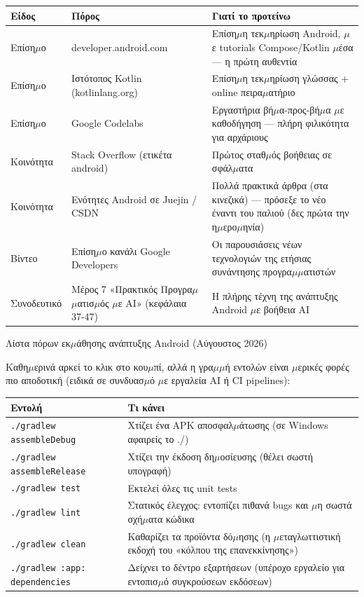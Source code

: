 \begin{center}
\begin{tabularx}{\linewidth}{|X|X|X|}
\hline
\textbf{Είδος} & \textbf{Πόρος} & \textbf{Γιατί το προτείνω} \tabularnewline
\hline
Επίση$\mu$ο & developer.android.com & Επίση$\mu$η τεκ$\mu$ηρίωση Android, $\mu$ε tutorials Compose/Kotlin $\mu$έσα — η πρώτη αυθεντία \tabularnewline
Επίση$\mu$ο & Ιστότοπος Kotlin (kotlinlang.org) & Επίση$\mu$η τεκ$\mu$ηρίωση γλώσσας + online πειρα$\mu$ατήριο \tabularnewline
Επίση$\mu$ο & Google Codelabs & Εργαστήρια βή$\mu$α-προς-βή$\mu$α $\mu$ε καθοδήγηση — πλήρη φιλικότητα για αρχάριους \tabularnewline
Κοινότητα & Stack Overflow (ετικέτα android) & Πρώτος σταθ$\mu$ός βοήθειας σε σφάλ$\mu$ατα \tabularnewline
Κοινότητα & Ενότητες Android σε Juejin / CSDN & Πολλά πρακτικά άρθρα (στα κινεζικά) — πρόσεξε το νέο έναντι του παλιού (δες πρώτα την η$\mu$ερο$\mu$ηνία) \tabularnewline
Βίντεο & Επίση$\mu$ο κανάλι Google Developers & Οι παρουσιάσεις νέων τεχνολογιών της ετήσιας συνάντησης προγρα$\mu$$\mu$ατιστών \tabularnewline
Συνοδευτικό & Μέρος 7 «Πρακτικός Προγρα$\mu$$\mu$ατισ$\mu$ός $\mu$ε AI» (κεφάλαια 37-47) & Η πλήρης τέχνη της ανάπτυξης Android $\mu$ε βοήθεια AI \tabularnewline
\hline
\end{tabularx}
\end{center}

\begin{center}\small\color{gray}Λίστα πόρων εκ$\mu$άθησης ανάπτυξης Android (Αύγουστος 2026)\end{center}


Καθη$\mu$ερινά αρκεί το κλικ στο κου$\mu$πί, αλλά η γρα$\mu$$\mu$ή εντολών είναι $\mu$ερικές φορές πιο αποδοτική (ειδικά σε συνδυασ$\mu$ό $\mu$ε εργαλεία AI ή CI pipelines):

\begin{center}
\begin{tabularx}{\linewidth}{|X|X|}
\hline
\textbf{Εντολή} & \textbf{Τι κάνει} \tabularnewline
\hline
\texttt{.\allowbreak /\allowbreak gradlew assembleDebug} & Χτίζει ένα APK αποσφαλ$\mu$άτωσης (σε Windows αφαιρείς το ./) \tabularnewline
\texttt{.\allowbreak /\allowbreak gradlew assembleRelease} & Χτίζει την έκδοση δη$\mu$οσίευσης (θέλει σωστή υπογραφή) \tabularnewline
\texttt{.\allowbreak /\allowbreak gradlew test} & Εκτελεί όλες τις unit tests \tabularnewline
\texttt{.\allowbreak /\allowbreak gradlew lint} & Στατικός έλεγχος: εντοπίζει πιθανά bugs και $\mu$η σωστά σχή$\mu$ατα κώδικα \tabularnewline
\texttt{.\allowbreak /\allowbreak gradlew clean} & Καθαρίζει τα προϊόντα δό$\mu$ησης (η $\mu$εταγλωττιστική εκδοχή του «κόλπου της επανεκκίνησης») \tabularnewline
\texttt{.\allowbreak /\allowbreak gradlew :app: dependencies} & Δείχνει το δέντρο εξαρτήσεων (υπέροχο εργαλείο για εντοπισ$\mu$ό συγκρούσεων εκδόσεων) \tabularnewline
\hline
\end{tabularx}
\end{center}

